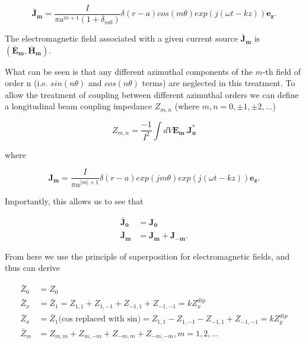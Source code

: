 \begin{equation}
\mathbf{\bar{J}_{m}} = \frac{I}{\pi a^{m +1} \left( 1 + \delta_{m0} \right)} \delta \left( r - a \right) cos \left( m \theta \right) exp \left( j \left( \omega t - k z  \right) \right) \mathbf{e_{z}}.
\end{equation}

The electromagnetic field associated with a given current source $\mathbf{\bar{J}_{m}}$ is $\left( \mathbf{\bar{E}_{m}}, \mathbf{\bar{H}_{m}} \right)$. 

What can be seen is that any different azimuthal components of the $m$-th field of order n (i.e. $sin \left( n\theta \right)$ and $cos \left( n\theta \right)$ terms) are neglected in this treatment. To allow the treatment of coupling between different azimuthal orders we can define a longitudinal beam coupling impedance $Z_{m,n}$ (where $m,n = 0, \pm 1, \pm 2, ... $)

\begin{equation}
Z_{m,n} = \frac{-1}{I^{2}} \int dV \mathbf{E_{m}. J_{n}^{*}}
\end{equation}

where

\begin{equation}
\mathbf{J_{m}} = \frac{I}{\pi a^{|m |+1}} \delta \left( r - a \right) exp \left(j m \theta \right) exp \left( j \left( \omega t - k z  \right) \right) \mathbf{e_{z}}.
\end{equation}

Importantly, this allows us to see that 

\begin{align}
\mathbf{\bar{J}_{0}} &= \mathbf{J_{0}} \nonumber \\
\mathbf{\bar{J}_{m}} &= \mathbf{J_{m}} + \mathbf{J_{-m}}.
\end{align}

From here we use the principle of superposition for electromagnetic fields, and thus can derive

\begin{align}
\bar{Z}_{0} &= Z_{0} \\
\bar{Z}_{x} &= \bar{Z}_{1} = Z_{1,1} + Z_{1,-1} + Z_{-1,1} + Z_{-1,-1} = kZ^{dip}_{x}\\
\bar{Z}_{x} &= \bar{Z}_{1} \text{(cos replaced with sin)}= Z_{1,1} - Z_{1,-1} - Z_{-1,1} + Z_{-1,-1} = kZ^{dip}_{y}\\
\bar{Z}_{m} &= Z_{m,m} + Z_{m,-m} + Z_{-m,m} + Z_{-m,-m}, m=1,2,...
\end{align}

